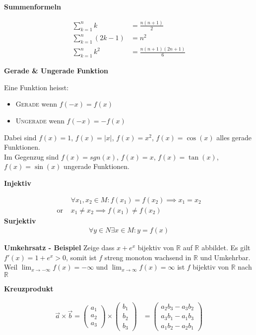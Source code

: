 \documentclass[25pt]{sciposter}
\newcommand{\R}{\mathbb{R}}
\newenvironment{method}[1]{\begin{mdframed}[backgroundcolor=blue!10,innertopmargin=15pt, innerbottommargin=15pt]
		\textbf{#1 }
	}
	{ 
	\end{mdframed}
}
\begin{document}
\begin{multicols}{3}
\begin{method}{Summenformeln}
	\begin{align*}
	\sum _{{k=1}}^{n}k &= {\frac  {n(n+1)}{2}}\\
	\sum_{k=1}^n (2k-1) &= n^2\\
	\sum _{{k=1}}^{n}k^{2} &= {\frac  {n(n+1)(2n+1)}{6}}
	\end{align*}
\end{method}


\begin{method}{Gerade \& Ungerade Funktion}
	Eine Funktion heisst:
	\begin{itemize}
		\item \textsc{Gerade} wenn $f(-x) = f(x)$
		\item \textsc{Ungerade} wenn $f(-x) = - f(x)$
	\end{itemize}
	Dabei sind $f(x) = 1$, $f(x) = |x|$, $f(x)=x^2$, $f(x) = \cos(x)$ alles gerade Funktionen.\\
	Im Gegenzug sind $f(x) = sgn(x)$, $f(x) = x$, $f(x) = \tan(x)$, $f(x) = \sin(x)$ ungerade Funktionen.
\end{method}


\begin{method}{Injektiv}
	\begin{align*}
	&\forall x_1,x_2 \in M : f(x_1) = f(x_2) \implies x_1 = x_2\\
	\text{or }  &x_1 \not = x_2 \implies f(x_1) \not = f(x_2)
	\end{align*}
	\textbf{Surjektiv}
	\begin{align*}
	\forall y \in N \exists x \in M : y = f(x)
	\end{align*}
\end{method}

\textbf{Umkehrsatz - Beispiel} Zeige dass $x + e^x$ bijektiv von $\R$ auf $\R$ abbildet. Es gilt $f'(x) = 1 + e^x > 0$, somit ist $f$ streng monoton wachsend in $\R$ und Umkehrbar. Weil $\lim_{x \to -\infty} f(x) = - \infty$ und $\lim_{x \to \infty} f(x) = \infty$ ist $f$ bijektiv von $\R$ nach $\R$



\begin{method}{Kreuzprodukt}
	\begin{align*}
	\vec{a}\times\vec{b}=	\begin{pmatrix}a_1 \\ a_2 \\ a_3\end{pmatrix}
	\times
	\begin{pmatrix}b_1 \\ b_2 \\ b_3 \end{pmatrix} &=	\begin{pmatrix}
	a_2b_3 - a_3b_2 \\
	a_3b_1 - a_1b_3 \\
	a_1b_2 - a_2b_1
	\end{pmatrix}
	\end{align*}
\end{method}




\end{multicols}
\end{document}
